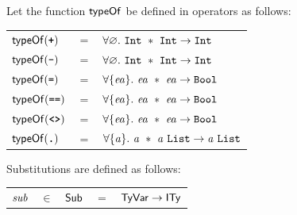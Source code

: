 \documentclass[final]{article}
\begin{document}
Let the function $\mathsf{typeOf}$ be defined in operators as
follows:
\begin{center}
  \begin{tabular}{lll}
    $\mathsf{typeOf}(\textbf{\texttt{+}})$
    & $=$
    & $\forall\mathord\varnothing.\ \mathtt{Int}\ *\ \mathtt{Int}\rightarrow\mathtt{Int}$
    \\

    $\mathsf{typeOf}(\textbf{\texttt{-}})$
    & $=$
    & $\forall\mathord\varnothing.\ \mathtt{Int}\ *\ \mathtt{Int}\rightarrow\mathtt{Int}$
    \\

    $\mathsf{typeOf}(\textbf{\texttt{=}})$
    & $=$
    & $\forall\{\mathit{ea}\}.\ \mathit{ea}\ *\ \mathit{ea}\rightarrow\mathtt{Bool}$
    \\

    $\mathsf{typeOf}(\textbf{\texttt{==}})$
    & $=$
    & $\forall\{\mathit{ea}\}.\ \mathit{ea}\ *\ \mathit{ea}\rightarrow\mathtt{Bool}$
    \\

    $\mathsf{typeOf}(\textbf{\texttt{<>}})$
    & $=$
    & $\forall\{\mathit{ea}\}.\ \mathit{ea}\ *\ \mathit{ea}\rightarrow\mathtt{Bool}$
    \\

    $\mathsf{typeOf}(\textbf{\texttt{.}})$
    & $=$
    & $\forall\{\mathit{a}\}.\ \mathit{a}\ *\ \mathit{a}\ \mathtt{List}\rightarrow\mathit{a}\ \mathtt{List}$
  \end{tabular}
\end{center}

Substitutions are defined as follows:
\begin{center}
  \begin{tabular}{lllrl}
    $\mathit{sub}$
    & $\in$
    & $\mathsf{Sub}$
    & $=$
    & $\mathsf{TyVar}\rightarrow\mathsf{ITy}$
  \end{tabular}
\end{center}
\end{document}
